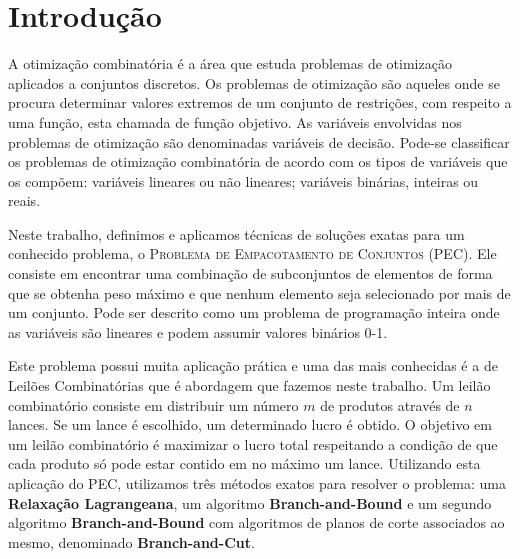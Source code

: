 \documentclass{article}
\begin{document}
	
	\section{Introdução}
	A otimização combinatória é a área que estuda problemas de otimização aplicados a conjuntos discretos. Os problemas de otimização são aqueles onde se procura determinar valores extremos de um conjunto de restrições, com respeito a uma função, esta chamada de função objetivo. As variáveis envolvidas nos problemas de otimização são denominadas variáveis de decisão. {\color{red} Pode-se classificar os problemas de otimização combinatória de acordo com os tipos de variáveis que os compõem: variáveis lineares ou não lineares; variáveis binárias, inteiras ou reais}.
	
	{\color{red}
	Neste trabalho, definimos e aplicamos técnicas de soluções exatas para um conhecido problema, o \textsc{Problema de Empacotamento de Conjuntos (PEC)}.
	Ele consiste em encontrar uma combinação de subconjuntos de elementos de forma que se obtenha peso máximo e que nenhum elemento seja selecionado por mais de um conjunto. Pode ser descrito como um problema de programação inteira onde as variáveis são lineares e podem assumir valores binários 0-1.
	}
	
	Este problema possui muita aplicação prática e uma das mais conhecidas é a de Leilões Combinatórias que é abordagem que fazemos neste trabalho. Um leilão combinatório consiste em distribuir um número $m$ de produtos através de $n$ lances. Se um lance é escolhido, um determinado lucro é obtido. O objetivo em um leilão combinatório é maximizar o lucro total respeitando a condição de que cada produto só pode estar contido em no máximo um lance. Utilizando esta aplicação do {\color{red} PEC}, utilizamos três métodos exatos para resolver o problema: uma \textbf{Relaxação Lagrangeana}, um algoritmo \textbf{Branch-and-Bound} e um segundo algoritmo \textbf{Branch-and-Bound} com algoritmos de planos de corte associados ao mesmo, denominado \textbf{Branch-and-Cut}.
	
\end{document}
